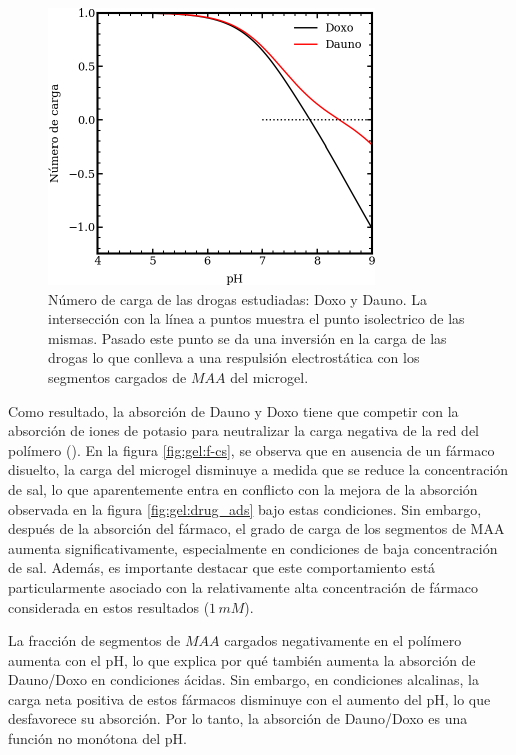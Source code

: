 \begin{figure}[!tb]
	\centering
	\includegraphics[width=0.9\linewidth]{Figures/graph-gel/drugs-Q.pdf}
	\caption{N\'umero de carga de las drogas estudiadas: Doxo y Dauno. La intersecci\'on con la l\'inea a puntos muestra el punto isolectrico de las mismas. Pasado este punto se da una inversi\'on en la carga de las drogas lo que conlleva a una respulsi\'on electrost\'atica con los segmentos cargados de $MAA$ del microgel. }
	\label{fig:gel:carga-drug_ads}
\end{figure}

Como resultado, la absorci\'on de Dauno y Doxo tiene que competir con la absorci\'on de iones de potasio para neutralizar la carga negativa de la red del pol\'imero (\citet{PerezChavez2020}). En la figura \ref{fig:gel:f-cs}, se observa que en ausencia de un f\'armaco disuelto, la carga del microgel disminuye a medida que se reduce la concentraci\'on de sal, lo que aparentemente entra en conflicto con la mejora de la absorci\'on observada en la figura \ref{fig:gel:drug_ads} bajo estas condiciones. Sin embargo, despu\'es de la absorci\'on del f\'armaco, el grado de carga de los segmentos de MAA aumenta significativamente, especialmente en condiciones de baja concentraci\'on de sal. Adem\'as, es importante destacar que este comportamiento est\'a particularmente asociado con la relativamente alta concentraci\'on de f\'armaco considerada en estos resultados ($1\, mM$).

La fracci\'on de segmentos de $MAA$ cargados negativamente en el pol\'imero aumenta con el pH, lo que explica por qu\'e tambi\'en aumenta la absorci\'on de Dauno/Doxo en condiciones \'acidas. Sin embargo, en condiciones alcalinas, la carga neta positiva de estos f\'armacos disminuye con el aumento del pH, lo que desfavorece su absorci\'on. Por lo tanto, la absorci\'on de Dauno/Doxo es una funci\'on no mon\'otona del pH.


